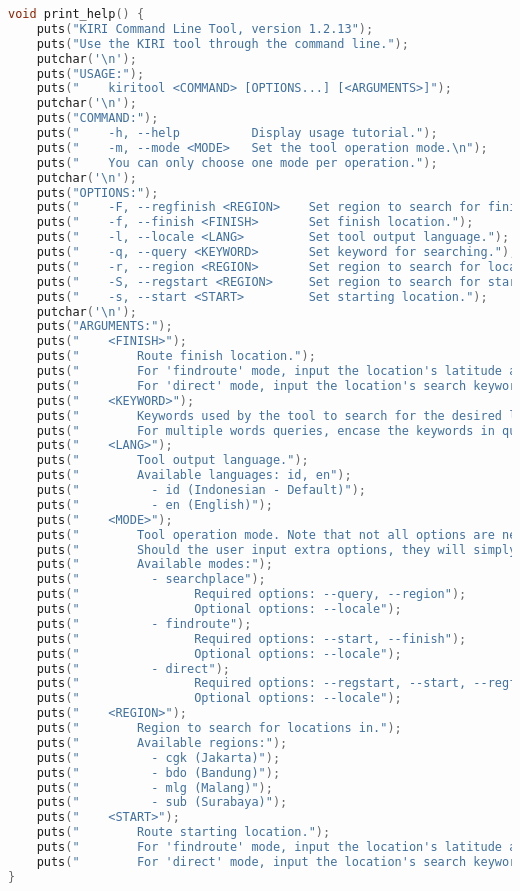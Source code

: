 \begin{lstlisting}[label={appdx:A-printhelp}, language=C, caption=\texttt{print\textunderscore help()}]
void print_help() {
    puts("KIRI Command Line Tool, version 1.2.13");
    puts("Use the KIRI tool through the command line.");
    putchar('\n');
    puts("USAGE:");
    puts("    kiritool <COMMAND> [OPTIONS...] [<ARGUMENTS>]");
    putchar('\n');
    puts("COMMAND:");
    puts("    -h, --help          Display usage tutorial.");
    puts("    -m, --mode <MODE>   Set the tool operation mode.\n");
    puts("    You can only choose one mode per operation.");
    putchar('\n');
    puts("OPTIONS:");
    puts("    -F, --regfinish <REGION>    Set region to search for finish location in.");
    puts("    -f, --finish <FINISH>       Set finish location.");
    puts("    -l, --locale <LANG>         Set tool output language.");
    puts("    -q, --query <KEYWORD>       Set keyword for searching.");
    puts("    -r, --region <REGION>       Set region to search for location in.");
    puts("    -S, --regstart <REGION>     Set region to search for starting location in.");
    puts("    -s, --start <START>         Set starting location.");
    putchar('\n');
    puts("ARGUMENTS:");
    puts("    <FINISH>");
    puts("        Route finish location.");
    puts("        For 'findroute' mode, input the location's latitude and longitude coordinates.");
    puts("        For 'direct' mode, input the location's search keyword (<KEYWORD> argument).");
    puts("    <KEYWORD>");
    puts("        Keywords used by the tool to search for the desired location.");
    puts("        For multiple words queries, encase the keywords in quotation marks (\" \").");
    puts("    <LANG>");
    puts("        Tool output language.");
    puts("        Available languages: id, en");
    puts("          - id (Indonesian - Default)");
    puts("          - en (English)");
    puts("    <MODE>");
    puts("        Tool operation mode. Note that not all options are needed for all modes.");
    puts("        Should the user input extra options, they will simply not be used.");
    puts("        Available modes:");
    puts("          - searchplace");
    puts("                Required options: --query, --region");
    puts("                Optional options: --locale");
    puts("          - findroute");   
    puts("                Required options: --start, --finish");
    puts("                Optional options: --locale");
    puts("          - direct");   
    puts("                Required options: --regstart, --start, --regfinish, --finish");
    puts("                Optional options: --locale");
    puts("    <REGION>");
    puts("        Region to search for locations in.");
    puts("        Available regions:");
    puts("          - cgk (Jakarta)");
    puts("          - bdo (Bandung)");
    puts("          - mlg (Malang)");
    puts("          - sub (Surabaya)");
    puts("    <START>");
    puts("        Route starting location.");
    puts("        For 'findroute' mode, input the location's latitude and longitude coordinates.");
    puts("        For 'direct' mode, input the location's search keyword (<KEYWORD> argument).");
}
\end{lstlisting}

